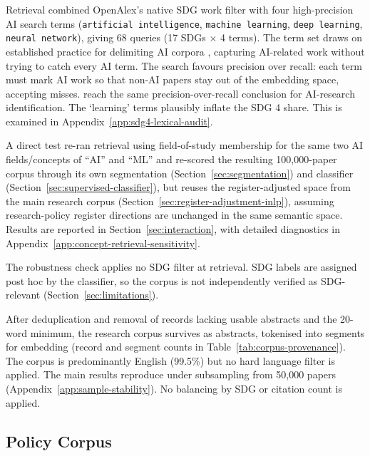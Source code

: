 \documentclass[12pt,a4paper]{article}
\begin{document}
 Retrieval combined OpenAlex's native SDG work filter with four high-precision AI search terms (\texttt{artificial intelligence}, \texttt{machine learning}, \texttt{deep learning}, \texttt{neural network}), giving 68 queries (17 SDGs $\times$ 4 terms). The term set draws on established practice for delimiting AI corpora \parencite{Elsevier2019, OECDAiMethod}, capturing AI-related work without trying to catch every AI term. The search favours precision over recall: each term must mark AI work so that non-AI papers stay out of the embedding space, accepting misses. \textcite{CSET2023} reach the same precision-over-recall conclusion for AI-research identification. The `learning' terms plausibly inflate the SDG 4 share. This is examined in Appendix~\ref{app:sdg4-lexical-audit}.

 A direct test re-ran retrieval using field-of-study membership for the same two AI fields/concepts of ``AI'' and ``ML'' \parencite{OECDAiMethod} and re-scored the resulting 100,000-paper corpus through its own segmentation (Section~\ref{sec:segmentation}) and classifier (Section~\ref{sec:supervised-classifier}), but reuses the register-adjusted space from the main research corpus (Section~\ref{sec:register-adjustment-inlp}), assuming research-policy register directions are unchanged in the same semantic space. Results are reported in Section~\ref{sec:interaction}, with detailed diagnostics in Appendix~\ref{app:concept-retrieval-sensitivity}.

  The robustness check applies no SDG filter at retrieval. SDG labels are assigned post hoc by the classifier, so the corpus is not independently verified as SDG-relevant (Section~\ref{sec:limitations}).

  After deduplication and removal of records lacking usable abstracts and the 20-word minimum, the research corpus survives as \NResearchAbstracts{} abstracts, tokenised into segments for embedding (record and segment counts in Table~\ref{tab:corpus-provenance}). The corpus is predominantly English (99.5\%) but no hard language filter is applied. The main results reproduce under subsampling from 50,000 papers (Appendix~\ref{app:sample-stability}). No balancing by SDG or citation count is applied.

\subsection{Policy Corpus}\label{sec:policy-corpus}
\end{document}
